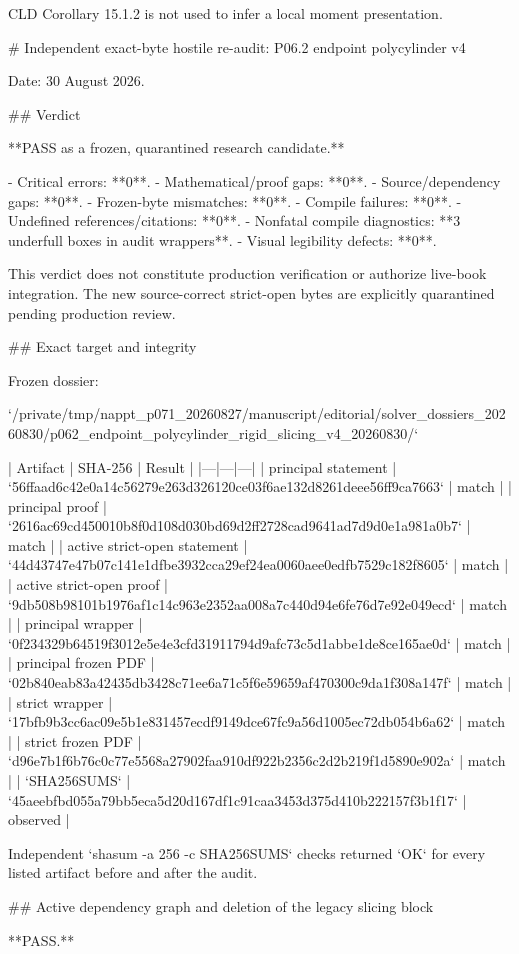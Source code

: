 CLD Corollary 15.1.2 is not used to infer a local moment presentation.

# Independent exact-byte hostile re-audit: P06.2 endpoint polycylinder v4

Date: 30 August 2026.

## Verdict

**PASS as a frozen, quarantined research candidate.**

- Critical errors: **0**.
- Mathematical/proof gaps: **0**.
- Source/dependency gaps: **0**.
- Frozen-byte mismatches: **0**.
- Compile failures: **0**.
- Undefined references/citations: **0**.
- Nonfatal compile diagnostics: **3 underfull boxes in audit wrappers**.
- Visual legibility defects: **0**.

This verdict does not constitute production verification or authorize live-book
integration.  The new source-correct strict-open bytes are explicitly
quarantined pending production review.

## Exact target and integrity

Frozen dossier:

`/private/tmp/nappt_p071_20260827/manuscript/editorial/solver_dossiers_20260830/p062_endpoint_polycylinder_rigid_slicing_v4_20260830/`

| Artifact | SHA-256 | Result |
|---|---|---|
| principal statement | `56ffaad6c42e0a14c56279e263d326120ce03f6ae132d8261deee56ff9ca7663` | match |
| principal proof | `2616ac69cd450010b8f0d108d030bd69d2ff2728cad9641ad7d9d0e1a981a0b7` | match |
| active strict-open statement | `44d43747e47b07c141e1dfbe3932cca29ef24ea0060aee0edfb7529c182f8605` | match |
| active strict-open proof | `9db508b98101b1976af1c14c963e2352aa008a7c440d94e6fe76d7e92e049ecd` | match |
| principal wrapper | `0f234329b64519f3012e5e4e3cfd31911794d9afc73c5d1abbe1de8ce165ae0d` | match |
| principal frozen PDF | `02b840eab83a42435db3428c71ee6a71c5f6e59659af470300c9da1f308a147f` | match |
| strict wrapper | `17bfb9b3cc6ac09e5b1e831457ecdf9149dce67fc9a56d1005ec72db054b6a62` | match |
| strict frozen PDF | `d96e7b1f6b76c0c77e5568a27902faa910df922b2356c2d2b219f1d5890e902a` | match |
| `SHA256SUMS` | `45aeebfbd055a79bb5eca5d20d167df1c91caa3453d375d410b222157f3b1f17` | observed |

Independent `shasum -a 256 -c SHA256SUMS` checks returned `OK` for every
listed artifact before and after the audit.

## Active dependency graph and deletion of the legacy slicing block

**PASS.**

